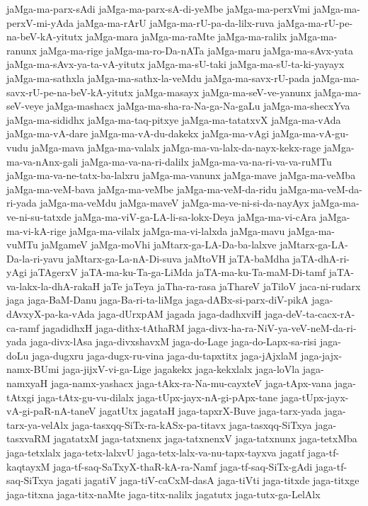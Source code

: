 {jaMga-ma-parx-sAdi
jaMga-ma-parx-sA-di-yeMbe
jaMga-ma-perxVmi
jaMga-ma-perxV-mi-yAda
jaMga-ma-rArU
jaMga-ma-rU-pa-da-lilx-ruva
jaMga-ma-rU-pe-na-beV-kA-yitutx
jaMga-mara
jaMga-ma-raMte
jaMga-ma-ralilx
jaMga-ma-ranunx
jaMga-ma-rige
jaMga-ma-ro-Da-nATa
jaMga-maru
jaMga-ma-sAvx-yata
jaMga-ma-sAvx-ya-ta-vA-yitutx
jaMga-ma-sU-taki
jaMga-ma-sU-ta-ki-yayayx
jaMga-ma-sathxla
jaMga-ma-sathx-la-veMdu
jaMga-ma-savx-rU-pada
jaMga-ma-savx-rU-pe-na-beV-kA-yitutx
jaMga-masayx
jaMga-ma-seV-ve-yanunx
jaMga-ma-seV-veye
jaMga-mashacx
jaMga-ma-sha-ra-Na-ga-Na-gaLu
jaMga-ma-shecxYva
jaMga-ma-sididhx
jaMga-ma-taq-pitxye
jaMga-ma-tatatxvX
jaMga-ma-vAda
jaMga-ma-vA-dare
jaMga-ma-vA-du-dakekx
jaMga-ma-vAgi
jaMga-ma-vA-gu-vudu
jaMga-mava
jaMga-ma-valalx
jaMga-ma-va-lalx-da-nayx-kekx-rage
jaMga-ma-va-nAnx-gali
jaMga-ma-va-na-ri-dalilx
jaMga-ma-va-na-ri-va-va-ruMTu
jaMga-ma-va-ne-tatx-ba-lalxru
jaMga-ma-vanunx
jaMga-mave
jaMga-ma-veMba
jaMga-ma-veM-bava
jaMga-ma-veMbe
jaMga-ma-veM-da-ridu
jaMga-ma-veM-da-ri-yada
jaMga-ma-veMdu
jaMga-maveV
jaMga-ma-ve-ni-si-da-nayAyx
jaMga-ma-ve-ni-su-tatxde
jaMga-ma-viV-ga-LA-li-sa-lokx-Deya
jaMga-ma-vi-cAra
jaMga-ma-vi-kA-rige
jaMga-ma-vilalx
jaMga-ma-vi-lalxda
jaMga-mavu
jaMga-ma-vuMTu
jaMgameV
jaMga-moVhi
jaMtarx-ga-LA-Da-ba-lalxve
jaMtarx-ga-LA-Da-la-ri-yavu
jaMtarx-ga-La-nA-Di-suva
jaMtoVH
jaTA-baMdha
jaTA-dhA-ri-yAgi
jaTAgerxV
jaTA-ma-ku-Ta-ga-LiMda
jaTA-ma-ku-Ta-maM-Di-tamf
jaTA-va-lakx-la-dhA-rakaH
jaTe
jaTeya
jaTha-ra-rasa
jaThareV
jaTiloV
jaca-ni-rudarx
jaga
jaga-BaM-Danu
jaga-Ba-ri-ta-liMga
jaga-dABx-si-parx-diV-pikA
jaga-dAvxyX-pa-ka-vAda
jaga-dUrxpAM
jagada
jaga-dadhxviH
jaga-deV-ta-cacx-rA-ca-ramf
jagadidhxH
jaga-dithx-tAthaRM
jaga-divx-ha-ra-NiV-ya-veV-neM-da-ri-yada
jaga-divx-lAsa
jaga-divxshavxM
jaga-do-Lage
jaga-do-Lapx-sa-risi
jaga-doLu
jaga-dugxru
jaga-dugx-ru-vina
jaga-du-tapxtitx
jaga-jAjxlaM
jaga-jajx-namx-BUmi
jaga-jijxV-vi-ga-Lige
jagakekx
jaga-kekxlalx
jaga-loVla
jaga-namxyaH
jaga-namx-yashacx
jaga-tAkx-ra-Na-mu-cayxteV
jaga-tApx-vana
jaga-tAtxgi
jaga-tAtx-gu-vu-dilalx
jaga-tUpx-jayx-nA-gi-pApx-tane
jaga-tUpx-jayx-vA-gi-paR-nA-taneV
jagatUtx
jagataH
jaga-tapxrX-Buve
jaga-tarx-yada
jaga-tarx-ya-velAlx
jaga-tasxqq-SiTx-ra-kASx-pa-titavx
jaga-tasxqq-SiTxya
jaga-tasxvaRM
jagatatxM
jaga-tatxnenx
jaga-tatxnenxV
jaga-tatxnunx
jaga-tetxMba
jaga-tetxlalx
jaga-tetx-lalxvU
jaga-tetx-lalx-va-nu-tapx-tayxva
jagatf
jaga-tf-kaqtayxM
jaga-tf-saq-SaTxyX-thaR-kA-ra-Namf
jaga-tf-saq-SiTx-gAdi
jaga-tf-saq-SiTxya
jagati
jagatiV
jaga-tiV-caCxM-dasA
jaga-tiVti
jaga-titxde
jaga-titxge
jaga-titxna
jaga-titx-naMte
jaga-titx-nalilx
jagatutx
jaga-tutx-ga-LelAlx
}
